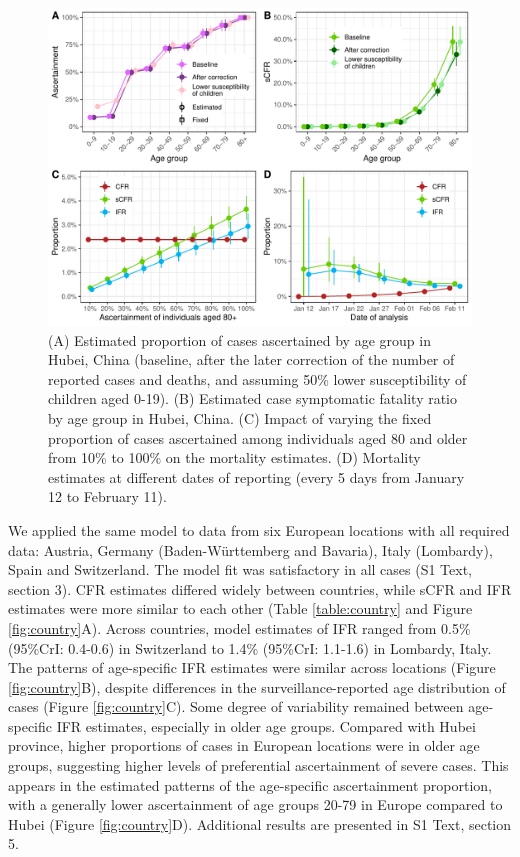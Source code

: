 \documentclass{article}
\begin{document}
\begin{figure}[h]
	\includegraphics[width=\linewidth]{../format_output/figures_v3/fig3.pdf}
	\caption{(A) Estimated proportion of cases ascertained by age group in Hubei, China (baseline, after the later correction of the number of reported cases and deaths, and assuming 50\% lower susceptibility of children aged 0-19). (B) Estimated case symptomatic fatality ratio by age group in Hubei, China. (C) Impact of varying the fixed proportion of cases ascertained among individuals aged 80 and older from 10\% to 100\% on the mortality estimates. (D) Mortality estimates at different dates of reporting (every 5 days from January 12 to February 11).} 
	\label{fig:sst}
\end{figure}

We applied the same model to data from six European locations with all required data: Austria, Germany (Baden-Württemberg and Bavaria), Italy (Lombardy), Spain and Switzerland. 
The model fit was satisfactory in all cases (S1 Text, section 3). 
CFR estimates differed widely between countries, while sCFR and IFR estimates were more similar to each other (Table \ref{table:country} and Figure \ref{fig:country}A). 
Across countries, model estimates of IFR ranged from 0.5\% (95\%CrI: 0.4-0.6) in Switzerland to 1.4\% (95\%CrI: 1.1-1.6) in Lombardy, Italy.
The patterns of age-specific IFR estimates were similar across locations (Figure \ref{fig:country}B), despite differences in the surveillance-reported age distribution of cases (Figure \ref{fig:country}C). 
Some degree of variability remained between age-specific IFR estimates, especially in older age groups. 
Compared with Hubei province, higher proportions of cases in European locations were in older age groups, suggesting higher levels of preferential ascertainment of severe cases. 
This appears in the estimated patterns of the age-specific ascertainment proportion, with a generally lower ascertainment of age groups 20-79 in Europe compared to Hubei (Figure \ref{fig:country}D).
Additional results are presented in S1 Text, section 5.
\end{document}
